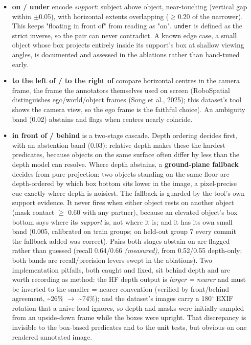 \begin{itemize}
\item \textbf{on / under} encode \textit{support}: subject above object, near-touching
(vertical gap within $\pm$0.05), with horizontal extents overlapping ($\geq$0.20 of the narrower). This keeps "floating in front of" from reading as "on". \texttt{under} is defined as the strict inverse, so the pair can never contradict. A known edge case, a small object whose box projects entirely inside its support's box at shallow viewing angles, is documented and assessed in the ablations rather than hand-tuned early.
\item \textbf{to the left of / to the right of} compare horizontal centres in the
camera frame, the frame the annotators themselves used on screen (RoboSpatial distinguishes ego/world/object frames (Song et al., 2025); this dataset's tool shows the camera view, so the ego frame is the faithful choice). An ambiguity band (0.02) abstains and flags when centres nearly coincide.
\item \textbf{in front of / behind} is a two-stage cascade. Depth ordering decides
first, with an abstention band (0.03): relative depth makes these the hardest predicates, because objects on the same surface often differ by less than the depth model can resolve. Where depth abstains, a \textbf{ground-plane fallback} decides from pure projection: two objects standing on the same floor are depth-ordered by which box bottom sits lower in the image, a pixel-precise cue exactly where depth is noisiest. The fallback is guarded by the tool's own support evidence. It never fires when either object rests on another object (mask contact $\geq$ 0.60 with any partner), because an elevated object's box bottom says where its \textit{support} is, not where it is; and it has its own small band (0.005, calibrated on train groups; on held-out group 7 every commit the fallback added was correct). Pairs both stages abstain on are flagged rather than guessed (recall 0.64/0.66 \textit{(measured)}, from 0.52/0.55 depth-only; both bands are recall/precision levers swept in the ablations). Two implementation pitfalls, both caught and fixed, sit behind depth and are worth recording as method: the HF depth output is \textit{larger = nearer} and must be inverted to the smaller = nearer convention (verified by front/behind agreement, \textasciitilde{}26\% $\rightarrow$ \textasciitilde{}74\%); and the dataset's images carry a 180$^{\circ}$ EXIF rotation that a naive load ignores, so depth and masks were initially sampled from an upside-down frame while the boxes were upright. That discrepancy is invisible to the box-based predicates and to the unit tests, but obvious on one rendered annotated image.

\end{itemize}

